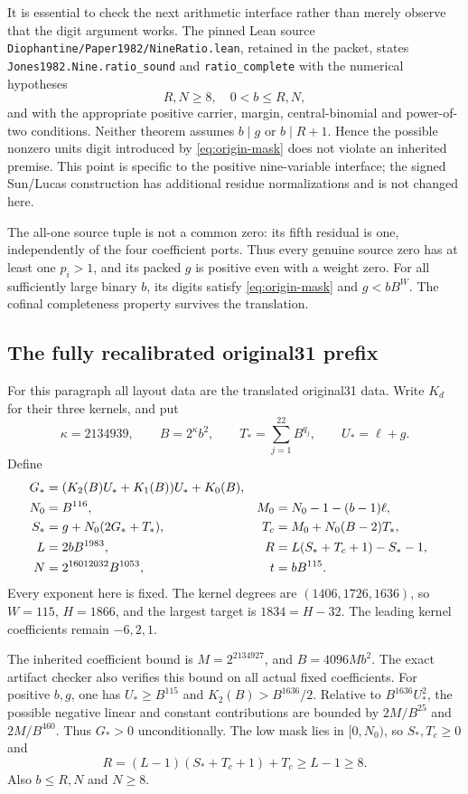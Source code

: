 It is essential to check the next arithmetic interface rather than merely
observe that the digit argument works.  The pinned Lean source
\texttt{Diophantine/Paper1982/NineRatio.lean}, retained in the packet,
states \texttt{Jones1982.Nine.ratio\_sound} and
\texttt{ratio\_complete} with the numerical hypotheses
\[
 R,N\ge8,\quad 0<b\le R,N,
\]
and with the appropriate positive carrier, margin, central-binomial
and power-of-two conditions.  Neither theorem assumes $b\mid g$ or
$b\mid R+1$.  Hence the possible nonzero units digit introduced by
\eqref{eq:origin-mask} does not violate an inherited premise.  This point
is specific to the positive nine-variable interface; the signed
Sun/Lucas construction has additional residue normalizations and is not
changed here.

The all-one source tuple is not a common zero: its fifth residual is one,
independently of the four coefficient ports.  Thus every genuine source
zero has at least one $p_i>1$, and its packed $g$ is positive even with a
weight zero.  For all sufficiently large binary $b$, its digits satisfy
\eqref{eq:origin-mask} and $g<bB^W$.  The cofinal completeness property
survives the translation.

\subsection{The fully recalibrated original31 prefix}

For this paragraph all layout data are the translated original31 data.
Write $K_d$ for their three kernels, and put
\[
 \kappa=2134939,\qquad B=2^\kappa b^2,\qquad
 T_*=\sum_{j=1}^{22}B^{q_j},\qquad U_* =\ell+g.
\]
Define
\begin{align}
 G_*&=(K_2(B)U_*+K_1(B))U_*+K_0(B),\notag\\
 N_0&=B^{116},& M_0&=N_0-1-(b-1)\ell,\notag\\
 S_*&=g+N_0(2G_*+T_*),&
 T_c&=M_0+N_0(B-2)T_*,\notag\\
 L&=2bB^{1983},&
 R&=L(S_*+T_c+1)-S_*-1,\notag\\
 N&=2^{16012032}B^{1053},&t&=bB^{115}.
 \label{eq:origin-prefix}
\end{align}
Every exponent here is fixed.  The kernel degrees are $(1406,1726,1636)$,
so $W=115$, $H=1866$, and the largest target is $1834=H-32$.
The leading kernel coefficients remain $-6,2,1$.

The inherited coefficient bound is $M=2^{2134927}$, and
$B=4096Mb^2$.  The exact artifact checker also verifies this bound on
all actual fixed coefficients.  For positive $b,g$, one has
$U_*\ge B^{115}$ and $K_2(B)>B^{1636}/2$.
Relative to $B^{1636}U_*^2$, the possible negative linear and constant
contributions are bounded by $2M/B^{25}$ and $2M/B^{460}$.
Thus $G_*>0$ unconditionally.  The low mask lies in $[0,N_0)$, so
$S_*,T_c\ge0$ and
\[
 R=(L-1)(S_*+T_c+1)+T_c\ge L-1\ge8.
\]
Also $b\le R,N$ and $N\ge8$.

